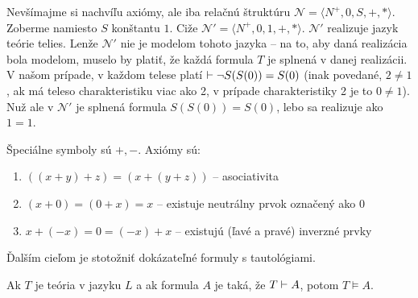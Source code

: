 \begin{poznamka}
    Nevšímajme si nachvíľu axiómy, ale iba relačnú štruktúru
    $\mathcal{N}=\langle N^+,0,S,+,* \rangle$.
    Zoberme namiesto $S$ konštantu $1$.
    Ciže $\mathcal{N}'=\langle N^+,0,1,+,* \rangle$.
    $\mathcal{N}'$ realizuje jazyk teórie telies.
    Lenže $\mathcal{N}'$ nie je modelom tohoto jazyka --
    na to, aby daná realizácia bola modelom, muselo by platiť, že
    každá formula $T$ je splnená v danej realizácii. V našom prípade,
    v každom telese platí $\vdash \neg S(S(0))=S(0)$ (inak
    povedané, $2 \ne 1$, ak má teleso charakteristiku viac ako 2,
    v prípade charakteristiky 2 je to $0 \ne 1$). Nuž ale v 
    $\mathcal{N}'$ je splnená formula $S(S(0))=S(0)$, lebo sa
    realizuje ako $1=1$.
\end{poznamka}

\begin{priklad}
    Špeciálne symboly sú $+,-$.
    Axiómy sú:
    \begin{enumerate}
            \item $((x+y)+z) = (x+(y+z))$ -- asociativita
            \item $(x+0) = (0+x) = x$ -- existuje neutrálny prvok
            označený ako 0
            \item $x+(-x) = 0 = (-x)+x$ -- existujú (ľavé a pravé) inverzné
            prvky
    \end{enumerate}
\end{priklad}

Ďalším cieľom je stotožniť dokázateľné formuly s tautológiami.

\begin{veta}[O korektnosti]
    Ak $T$ je teória v jazyku $L$ a ak formula $A$ je taká,
    že $T \vdash A$, potom $T \models A$.
\end{veta}

